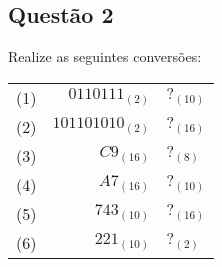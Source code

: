 \documentclass{article}
\begin{document}
        \subsection{Questão 2}
            \begin{exercise}
                Realize as seguintes conversões:
                    \begin{table}[H]
                        \centering  
                        \begin{tabular}[]{crl}\hline
                            (1) & $0110111_{(2)}$   & $?_{(10)}$\\
                            (2) & $101101010_{(2)}$ & $?_{(16)}$\\
                            (3) & $C9_{(16)}$       & $?_{(8)}$\\
                            (4) & $A7_{(16)}$       & $?_{(10)}$\\
                            (5) & $743_{(10)}$      & $?_{(16)}$\\
                            (6) & $221_{(10)}$      & $?_{(2)}$\\\hline
                        \end{tabular}
                    \end{table}
            \end{exercise}
\end{document}
